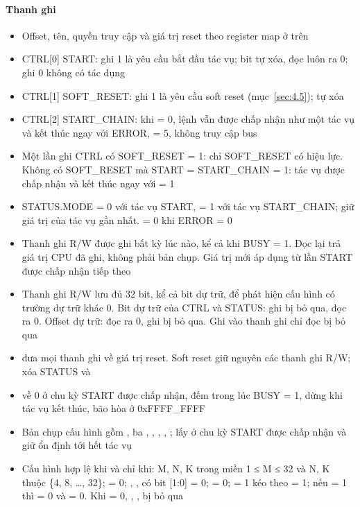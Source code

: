\paragraph{Thanh ghi}\label{tab:3-4}
\begin{itemize}
\item Offset, tên, quyền truy cập và giá trị reset theo register map ở trên
\item CTRL[0] START: ghi 1 là yêu cầu bắt đầu tác vụ; bit tự xóa, đọc luôn ra 0; ghi 0 không có tác dụng
\item CTRL[1] SOFT\_RESET: ghi 1 là yêu cầu soft reset (mục~\ref{sec:4.5}); tự xóa
\item CTRL[2] START\_CHAIN: khi  = 0, lệnh vẫn được chấp nhận như một tác vụ và kết thúc ngay với ERROR,  = 5, không truy cập bus
\item Một lần ghi CTRL có SOFT\_RESET = 1: chỉ SOFT\_RESET có hiệu lực. Không có SOFT\_RESET mà START = START\_CHAIN = 1: tác vụ được chấp nhận và kết thúc ngay với  = 1
\item STATUS.MODE = 0 với tác vụ START, = 1 với tác vụ START\_CHAIN; giữ giá trị của tác vụ gần nhất.  = 0 khi ERROR = 0
\item Thanh ghi R/W được ghi bất kỳ lúc nào, kể cả khi BUSY = 1. Đọc lại trả giá trị CPU đã ghi, không phải bản chụp. Giá trị mới áp dụng từ lần START được chấp nhận tiếp theo
\item Thanh ghi R/W lưu đủ 32 bit, kể cả bit dự trữ, để phát hiện cấu hình có trường dự trữ khác 0. Bit dự trữ của CTRL và STATUS: ghi bị bỏ qua, đọc ra 0. Offset dự trữ: đọc ra 0, ghi bị bỏ qua. Ghi vào thanh ghi chỉ đọc bị bỏ qua
\item {} đưa mọi thanh ghi về giá trị reset. Soft reset giữ nguyên các thanh ghi R/W; xóa STATUS và 
\item {} về 0 ở chu kỳ START được chấp nhận, đếm trong lúc BUSY = 1, dừng khi tác vụ kết thúc, bão hòa ở 0xFFFF\_FFFF
\item Bản chụp cấu hình gồm , ba , , , , ; lấy ở chu kỳ START được chấp nhận và giữ ổn định tới hết tác vụ
\item Cấu hình hợp lệ khi và chỉ khi: M, N, K trong miền 1 ≤ M ≤ 32 và N, K thuộc \{4, 8, …, 32\};  = 0; , ,  có bit [1:0] = 0;  = 0;  = 1 kéo theo  = 1; nếu  = 1 thì  = 0 và  = 0. Khi  = 0, , ,  bị bỏ qua
\end{itemize}


